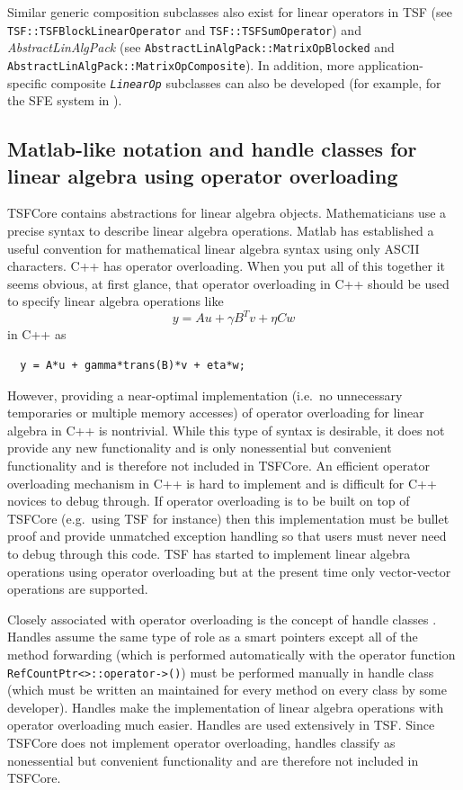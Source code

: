 Similar generic composition subclasses also exist for linear operators
in TSF (see {}\texttt{TSF\-::TSF\-Block\-Linear\-Operator} and
{}\texttt{TSF\-::TSF\-Sum\-Operator}) and
{}\textit{AbstractLinAlgPack} (see
{}\texttt{Abstract\-Lin\-Alg\-Pack\-::Matrix\-Op\-Blocked} and
{}\texttt{Abstract\-Lin\-Alg\-Pack\-::Matrix\-Op\-Composite}).  In
addition, more application-specific composite
{}\texttt{\textit{LinearOp}} subclasses can also be developed (for
example, for the SFE system in {}\cite{ref:sfe}).

%
\subsection{Matlab-like notation and handle classes for linear algebra
using operator overloading}
\label{tsfcore:sec:operator_overloading}
%

TSFCore contains abstractions for linear algebra objects.
Mathematicians use a precise syntax to describe linear algebra
operations.  Matlab {}\cite{ref:matlab} has established a useful
convention for mathematical linear algebra syntax using only ASCII
characters.  C++ has operator overloading.  When you put all of this
together it seems obvious, at first glance, that operator overloading
in C++ should be used to specify linear algebra operations like
%
\[
y = A u + \gamma B^T v + \eta C w
\]
%
in C++ as
%
\begin{verbatim}
  y = A*u + gamma*trans(B)*v + eta*w;
\end{verbatim}

{}\noindent{}However, providing a near-optimal implementation (i.e.~no
unnecessary temporaries or multiple memory accesses) of operator
overloading for linear algebra in C++ is nontrivial.  While this type
of syntax is desirable, it does not provide any new functionality and
is only nonessential but convenient functionality and is therefore not
included in TSFCore.  An efficient operator overloading mechanism in
C++ is hard to implement and is difficult for C++ novices to debug
through.  If operator overloading is to be built on top of TSFCore
(e.g.~using TSF for instance) then this implementation must be bullet
proof and provide unmatched exception handling so that users must
never need to debug through this code.  TSF has started to implement
linear algebra operations using operator overloading but at the
present time only vector-vector operations are supported.

Closely associated with operator overloading is the concept of handle
classes {}\cite{ref:advanced_c++_coplien}.  Handles assume the same
type of role as a smart pointers except all of the method forwarding
(which is performed automatically with the operator function
{}\texttt{RefCountPtr<>\-::operator->()}) must be performed manually
in handle class (which must be written an maintained for every method
on every class by some developer).  Handles make the implementation of
linear algebra operations with operator overloading much easier.
Handles are used extensively in TSF.  Since TSFCore does not implement
operator overloading, handles classify as nonessential but convenient
functionality and are therefore not included in TSFCore.

